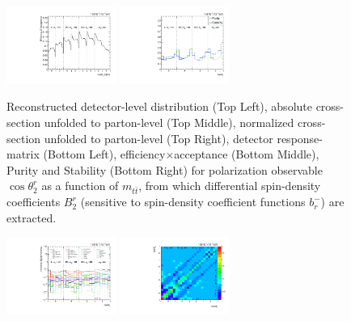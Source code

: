 \begin{refsection}
\begin{figure}[htb]
\begin{center}
 \includegraphics[width=0.32\textwidth]{fig_fullRun2UL/unfolding/combined/TotEff_b2r_mttbar.pdf}
 \includegraphics[width=0.32\textwidth]{fig_fullRun2UL/unfolding/combined/PurStab_b2r_mttbar.pdf} \\
\caption{Reconstructed detector-level distribution (Top Left), absolute cross-section unfolded to parton-level (Top Middle), normalized cross-section unfolded to parton-level (Top Right), detector response-matrix (Bottom Left), efficiency$\times$acceptance (Bottom Middle), Purity and Stability (Bottom Right) for polarization observable $\cos\theta_{2}^{r}$ as a function of $m_{t\bar{t}}$, from which differential spin-density coefficients $B_{2}^{r}$ (sensitive to spin-density coefficient functions $b_r^{-}$) are extracted.}
\label{fig:b2r_mttbar}
\end{center}
\end{figure}
\clearpage
\begin{figure}[htb]
\begin{center}
 \includegraphics[width=0.32\textwidth]{fig_fullRun2UL/unfolding/combined/deltaSystCombinedlog_rebinnedB_b2r_mttbar.pdf}
 \includegraphics[width=0.32\textwidth]{fig_fullRun2UL/unfolding/combined/StatCovMatrix_rebinnedB_b2r_mttbar.pdf}

\end{center}
\end{figure}
\end{refsection}

